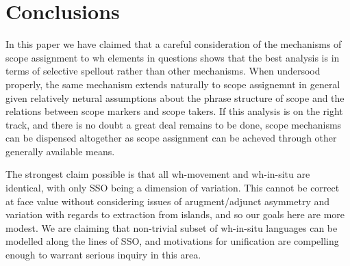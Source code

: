 \documentclass[11pt]{article}
\begin{document}
\section{Conclusions}
In this paper we have claimed that a careful consideration of the mechanisms of scope assignment to wh elements in questions shows that the best analysis is in terms of selective spellout rather than other mechanisms.  When undersood properly, the same mechanism extends naturally to scope assignemnt in general given relatively netural assumptions about the phrase structure of scope and the relations between scope markers and scope takers.  If this analysis is on the right track, and there is no doubt a great deal remains to be done, scope mechanisms can be dispensed altogether as scope assignment can be acheved through other generally available means.




The strongest claim possible is that all wh-movement and wh-in-situ are identical, with only SSO being a dimension of variation. This cannot be correct at face value without considering issues of arugment/adjunct asymmetry and variation with regards to extraction from islands, and so our goals here are more modest. We are claiming that non-trivial subset of wh-in-situ languages can be modelled along the lines of SSO, and motivations for unification are compelling enough to warrant serious inquiry in this area.


\newpage
%
\end{document}

